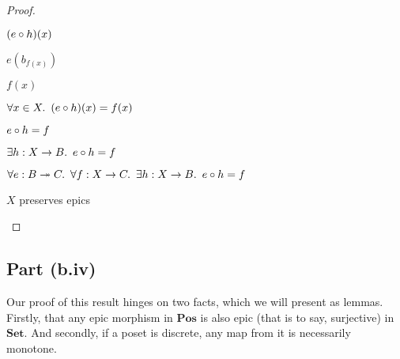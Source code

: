 \begin{prop}
\begin{proof}
\begin{itemize}
\begin{itemize}
\begin{itemize}
                \step $(e\circ h)(x)$

                \step[=] $e(b_{f(x)})$

                \step[=] $f(x)$
              \end{itemize}

              \step[\imps]
                $\forall x\in X\ldotp~(e\circ h)(x) = f(x)$
                \marginnote{$\forall$-\Intro}

              \step[\iffs]
                $e\circ h = f$
                \marginnote{\Def-$=$}

              \step[\imps]
                $\exists h : X \to B\ldotp~e\circ h = f$
                \marginnote{$\exists$-\Intro}
        \end{itemize}

        \step[\imps]
          $\forall e : B\twoheadrightarrow C\ldotp~\forall f : X \to C\ldotp~\exists h : X \to B\ldotp~e\circ h = f$
          \marginnote{$\forall$-\Intro}

        \step[\iffs]
          $X$ preserves epics
          \qedhere
          \marginnote{\Thm-\ref{prop:epic-preserving}}
    \end{itemize}
  \end{proof}
\end{prop}

\subsection{Part (b.iv)}\label{sec:q-1-b-iv}

Our proof of this result hinges on two facts, which we will present as lemmas. Firstly, that any epic morphism in $\mathbf{Pos}$ is also epic (that is to say, surjective) in $\mathbf{Set}$. And secondly, if a poset is discrete, any map from it is necessarily monotone.

